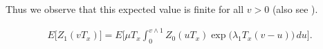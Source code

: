 Thus we observe that this expected value is finite for all $v>0$ (also see \cite{koon,zvai,xjon,marg}).

\begin{eqnarray}
E \bigl[Z_1(vT_x) \bigr]= E
\biggl[\mu T_x\int_0^{v\wedge
1}Z_0(uT_x)
\exp \bigl(\lambda_1T_x(v-u) \bigr)\,du \biggr].
\end{eqnarray}
